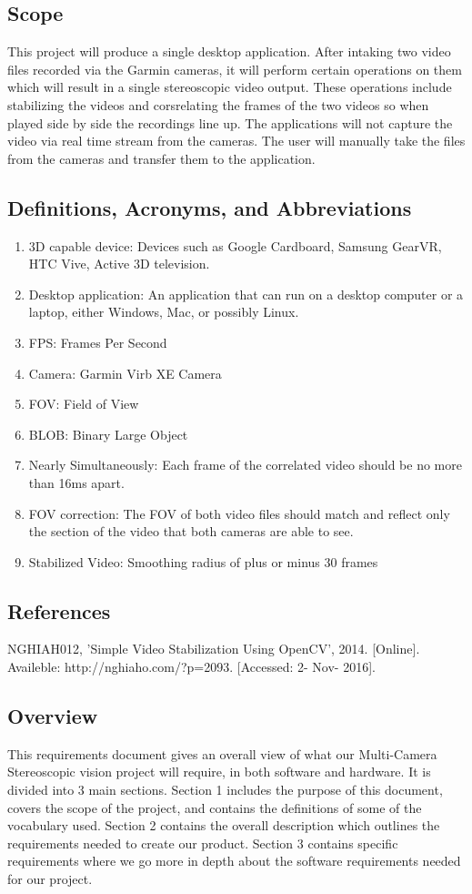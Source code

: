 \documentclass[10pt,letterpaper,onecolumn]{article}
\begin{document}
\subsection{Scope}
This project will produce a single desktop application. After intaking two video files recorded via the Garmin cameras, it will perform certain operations on them which will result in a single stereoscopic video output. These operations include stabilizing the videos and corsrelating the frames of the two videos so when played side by side the recordings line up. The applications will not capture the video via real time stream from the cameras. The user will manually take the files from the cameras and transfer them to the application.
\subsection{Definitions, Acronyms, and Abbreviations}
\begin{enumerate}
  \item 3D capable device: Devices such as Google Cardboard, Samsung GearVR, HTC Vive,  Active 3D television.
  \item Desktop application: An application that can run on a desktop computer or a laptop, either Windows, Mac, or possibly Linux.
  \item FPS: Frames Per Second
  \item Camera: Garmin Virb XE Camera
  \item FOV: Field of View
  \item BLOB: Binary Large Object
  \item Nearly Simultaneously: Each frame of the correlated video should be no more than 16ms apart.
  \item FOV correction: The FOV of both video files should match and reflect only the section of the video that both cameras are able to see.
  \item Stabilized Video: Smoothing radius of plus or minus 30 frames
\end{enumerate}

\subsection{References}
NGHIAH012, 'Simple Video Stabilization Using OpenCV', 2014. [Online]. Availeble: http://nghiaho.com/?p=2093. [Accessed: 2- Nov- 2016].

\subsection{Overview}
This requirements document gives an overall view of what our Multi-Camera Stereoscopic vision project will require, in both software and hardware. It is divided into 3 main sections. Section 1 includes the purpose of this document, covers the scope of the project, and contains the definitions of some of the vocabulary used. Section 2 contains the overall description which outlines the requirements needed to create our product. Section 3 contains specific requirements where we go more in depth about the software requirements needed for our project.
\end{document}
